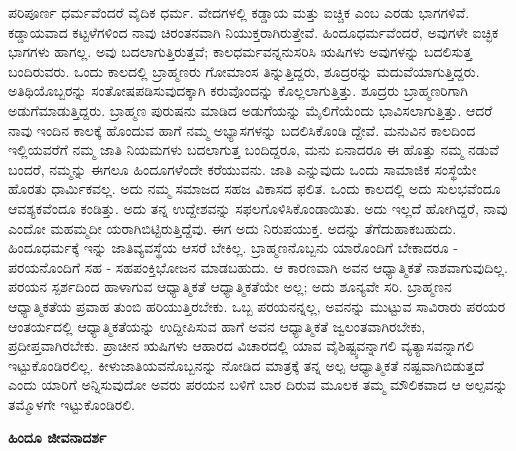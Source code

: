 ಪರಿಪೂರ್ಣ ಧರ್ಮವೆಂದರೆ ವೈದಿಕ ಧರ್ಮ. ವೇದಗಳಲ್ಲಿ ಕಡ್ಡಾಯ ಮತ್ತು ಐಚ್ಚಿಕ ಎಂಬ ಎರಡು ಭಾಗಗಳಿವೆ. ಕಡ್ಡಾಯವಾದ ಕಟ್ಟಳೆಗಳಿಂದ ನಾವು ಚಿರಂತನವಾಗಿ ನಿಯುಕ್ತರಾಗಿರುತ್ತೇವೆ. ಹಿಂದೂಧರ್ಮವೆಂದರೆ, ಅವುಗಳೇ ಐಚ್ಛಿಕ ಭಾಗಗಳು ಹಾಗಲ್ಲ. ಅವು ಬದಲಾಗುತ್ತಿರುತ್ತವೆ; ಕಾಲಧರ್ಮವನ್ನನುಸರಿಸಿ ಋಷಿಗಳು ಅವುಗಳನ್ನು ಬದಲಿಸುತ್ತ ಬಂದಿರುವರು. ಒಂದು ಕಾಲದಲ್ಲಿ ಬ್ರಾಹ್ಮಣರು ಗೋಮಾಂಸ ತಿನ್ನುತ್ತಿದ್ದರು, ಶೂದ್ರರನ್ನು ಮದುವೆಯಾಗುತ್ತಿದ್ದರು. ಅತಿಥಿಯೊಬ್ಬರನ್ನು ಸಂತೋಷಪಡಿಸುವುದಕ್ಕಾಗಿ ಕರುವೊಂದನ್ನು ಕೊಲ್ಲಲಾಗುತ್ತಿತ್ತು. ಶೂದ್ರರು ಬ್ರಾಹ್ಮಣರಿಗಾಗಿ ಅಡುಗೆಮಾಡುತ್ತಿದ್ದರು. ಬ್ರಾಹ್ಮಣ ಪುರುಷನು ಮಾಡಿದ ಅಡುಗೆಯನ್ನು ಮೈಲಿಗೆಯೆಂದು ಭಾವಿಸಲಾಗುತ್ತಿತ್ತು. ಆದರೆ ನಾವು ಇಂದಿನ ಕಾಲಕ್ಕೆ ಹೊಂದುವ ಹಾಗೆ ನಮ್ಮ ಅಭ್ಯಾಸಗಳನ್ನು ಬದಲಿಸಿಕೊಂಡಿ ದ್ದೇವೆ. ಮನುವಿನ ಕಾಲದಿಂದ ಇಲ್ಲಿಯವರೆಗೆ ನಮ್ಮ ಜಾತಿ ನಿಯಮಗಳು ಬದಲಾಗುತ್ತ ಬಂದಿದ್ದರೂ, ಮನು ಏನಾದರೂ ಈ ಹೊತ್ತು ನಮ್ಮ ನಡುವೆ ಬಂದರೆ, ನಮ್ಮನ್ನು ಈಗಲೂ ಹಿಂದೂಗಳೆಂದೇ ಕರೆಯುವನು. ಜಾತಿ ಎನ್ನುವುದು ಒಂದು ಸಾಮಾಜಿಕ ಸಂಸ್ಥೆಯೇ ಹೊರತು ಧಾರ್ಮಿಕವಲ್ಲ. ಅದು ನಮ್ಮ ಸಮಾಜದ ಸಹಜ ವಿಕಾಸದ ಫಲಿತ. ಒಂದು ಕಾಲದಲ್ಲಿ ಅದು ಸುಲಭವೆಂದೂ ಆವಶ್ಯಕವೆಂದೂ ಕಂಡಿತ್ತು. ಅದು ತನ್ನ ಉದ್ದೇಶವನ್ನು ಸಫಲಗೊಳಿಸಿಕೊಂಡಾಯಿತು. ಅದು ಇಲ್ಲದೆ ಹೋಗಿದ್ದರೆ, ನಾವು ಎಂದೋ ಮಹಮ್ಮದೀ ಯರಾಗಿಬಿಟ್ಟಿರುತ್ತಿದ್ದೆವು. ಈಗ ಅದು ನಿರುಪಯುಕ್ತ. ಅದನ್ನು ತೆಗೆದುಹಾಕಬಹುದು. ಹಿಂದೂಧರ್ಮಕ್ಕೆ ಇನ್ನು ಜಾತಿವ್ಯವಸ್ಥೆಯ ಆಸರೆ ಬೇಕಿಲ್ಲ. ಬ್ರಾಹ್ಮಣನೊಬ್ಬನು ಯಾರೊಂದಿಗೆ ಬೇಕಾದರೂ - ಪರಯನೊಂದಿಗೆ ಸಹ - ಸಹಪಂಕ್ತಿಭೋಜನ ಮಾಡಬಹುದು. ಆ ಕಾರಣವಾಗಿ ಅವನ ಆಧ್ಯಾತ್ಮಿಕತೆ ನಾಶವಾಗುವುದಿಲ್ಲ. ಪರಯನ ಸ್ಪರ್ಶದಿಂದ ಹಾಳಾಗುವ ಆಧ್ಯಾತ್ಮಿಕತೆ ಆಧ್ಯಾತ್ಮಿಕತೆಯೇ ಅಲ್ಲ; ಅದು ಶೂನ್ಯವೇ ಸರಿ. ಬ್ರಾಹ್ಮಣನ ಆಧ್ಯಾತ್ಮಿಕತೆಯ ಪ್ರವಾಹ ತುಂಬಿ ಹರಿಯುತ್ತಿರಬೇಕು. ಒಬ್ಬ ಪರಯನನ್ನಲ್ಲ, ಅವನನ್ನು ಮುಟ್ಟುವ ಸಾವಿರಾರು ಪರಯರ ಆಂತರ್ಯದಲ್ಲಿ ಆಧ್ಯಾತ್ಮಿಕತೆಯನ್ನು ಉದ್ದೀಪಿಸುವ ಹಾಗೆ ಅವನ ಆಧ್ಯಾತ್ಮಿಕತೆ ಜ್ವಲಂತವಾಗಿರಬೇಕು, ಪ್ರದೀಪ್ತವಾಗಿರಬೇಕು. ಪ್ರಾಚೀನ ಋಷಿಗಳು ಆಹಾರದ ವಿಚಾರದಲ್ಲಿ ಯಾವ ವೈಶಿಷ್ಟ್ಯವನ್ನಾಗಲಿ ವ್ಯತ್ಯಾಸವನ್ನಾಗಲಿ ಇಟ್ಟುಕೊಂಡಿರಲಿಲ್ಲ. ಕೀಳುಜಾತಿಯವನೊಬ್ಬನನ್ನು ನೋಡಿದ ಮಾತ್ರಕ್ಕೆ ತನ್ನ ಅಲ್ಪ ಆಧ್ಯಾತ್ಮಿಕತೆ ನಷ್ಟವಾಗಿಬಿಡುತ್ತದೆ ಎಂದು ಯಾರಿಗೆ ಅನ್ನಿಸುವುದೋ ಅವರು ಪರಯನ ಬಳಿಗೆ ಬಾರ ದಿರುವ ಮೂಲಕ ತಮ್ಮ ಮೌಲಿಕವಾದ ಆ ಅಲ್ಪವನ್ನು ತಮ್ಮೊಳಗೇ ಇಟ್ಟುಕೊಂಡಿರಲಿ.

\begin{center}
\textbf{ಹಿಂದೂ ಜೀವನಾದರ್ಶ}
\end{center}

